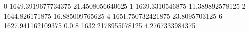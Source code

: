 0 1649.3919677734375 21.4508056640625
1 1639.3310546875 11.389892578125
2 1644.826171875 16.885009765625
4 1651.750732421875 23.8095703125
6 1627.941162109375 0.0
8 1632.2178955078125 4.2767333984375
